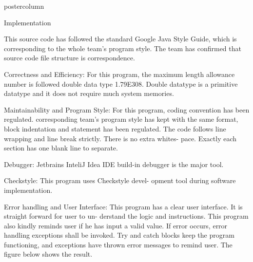\documentclass[final,hyperref={pdfpagelabels=false}]{beamer}
\newlength{\columnheight}
\begin{document}
\begin{frame}
\begin{columns}
    \begin{column}{.49\textwidth}
      \begin{beamercolorbox}[center,wd=\textwidth]{postercolumn}
        \begin{minipage}[T]{.95\textwidth} %
          \parbox[t][\columnheight]{\textwidth}{ %
            
            \begin{block}{Implementation}
            
                    \begin{itemize}
          {\small            \item  This source code has followed the standard Google Java Style Guide, which
is corresponding to the whole team's program style. The team has confirmed
that source code file structure is correspondence. }
               {\small       \item Correctness and Efficiency: For this program, the maximum length
allowance number is followed double data type 1.79E308. Double datatype is a primitive datatype and it
does not require much system memories. }
                 {\small     \item Maintainability and Program Style: For this program, coding convention has been regulated. corresponding team's program style has kept with
the same format, block indentation and statement has been regulated. The
code follows line wrapping and line break strictly. There is no extra whites-
pace. Exactly each section has one blank line to separate. }
 {\small 
\item Debugger: Jetbrains InteliJ Idea IDE build-in debugger is the major tool.
\item Checkstyle: This program uses Checkstyle devel-
opment tool during software implementation.
}
 {\small 
\item Error handling and User Interface: This program has a clear user interface. It is straight forward for user to un-
derstand the logic and instructions. This program also kindly reminds user if
he has input a valid value. If error occurs, error handling exceptions shall be
invoked. Try and catch blocks keep the program functioning, and exceptions
have thrown error messages to remind user. The figure below shows the result.
}
              

\end{itemize}
\end{block}}
\end{minipage}
\end{beamercolorbox}
\end{column}
\end{columns}
\end{frame}
\end{document}
